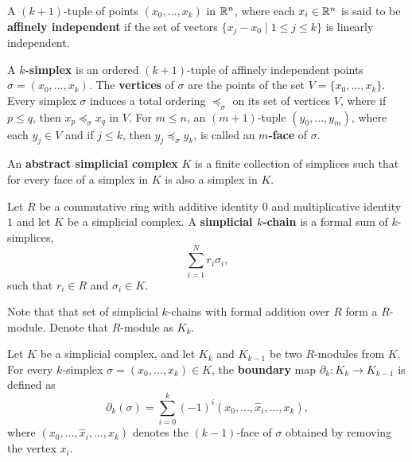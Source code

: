 \begin{definition}
    A $ (k+1)$-tuple of points $ (x_0, \dots, x_k) $ in $ \mathbb R^n $, where each 
    $ x_i \in \mathbb R^n $ is said to be {\bf affinely independent} if the set of vectors $ \{ x_j - x_0 \mid 1 \leq j \leq k \}$ is linearly independent.
\end{definition}

\begin{definition}[$k$-simplex]
    A {\bf $k$-simplex} is an ordered $(k+1)$-tuple of affinely independent points $\sigma = (x_0, \dots, x_k)$. The {\bf vertices} of $\sigma$ are the points of the set $ V = \{ x_0, \dots, x_k \} $. Every simplex $\sigma$ induces a total ordering $\preccurlyeq_{\sigma}$ on its set of vertices $V$, where if $p \leq q$, then $x_p \preccurlyeq_{\sigma} x_q$ in $V$. For $m \leq n$, an $(m + 1)$-tuple $(y_0, \dots, y_m)$, where each $y_j \in V$ and if $j \leq k$, then $y_j \preccurlyeq_{\sigma} y_k$, is called an {\bf $m$-face} of $\sigma$.
\end{definition}

\begin{definition}
    An {\bf abstract simplicial complex} $K $ is a finite collection of simplices such that for every face of a simplex in $ K $ is also a simplex in $ K $.
\end{definition}

\begin{definition}
    Let $R$ be a commutative ring with additive identity $0 $ and multiplicative identity $1$ and let $K$ be a simplicial complex. A {\bf simplicial $k$-chain} is a formal sum of $k$-simplices,
    \begin{equation}
        \sum_{i=1}^{N} r_i \sigma_i,
    \end{equation}
    such that $r_i \in R$ and $\sigma_i \in K $.
\end{definition}

Note that that set of simplicial $k$-chains with formal addition over $R$ form a $R$-module. Denote that $R$-module as $K_k$.

\begin{definition}
    Let $ K $ be a simplicial complex, and let $ K_k $ and $ K_{k-1} $ be two $ R$-modules from $ K $. For every $k$-simplex $\sigma =  (x_0, \dots, x_k) \in K $, the {\bf boundary} map $ \partial_k \colon K_k \to K_{k-1} $ is defined as
    \begin{equation}
        \partial_k(\sigma) = \sum_{i=0}^{k} (-1)^i (x_0, \dots, \hat x_i, \dots, x_k),
    \end{equation}
    where $ (x_0, \dots, \hat x_i, \dots, x_k) $ denotes the $(k-1)$-face of $\sigma $ obtained by removing the vertex $x_i$.
\end{definition}

